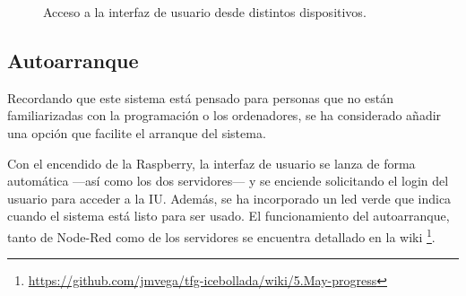 \begin{figure}[h!]
  \begin{center}
    \hspace{2mm}
  \end{center}
\caption{Acceso a la interfaz de usuario desde distintos dispositivos.} \label{fig:userlogin}
\end{figure}

\subsection{Autoarranque}
Recordando que este sistema está pensado para personas que no están familiarizadas con la programación o los ordenadores, se ha considerado añadir una opción que facilite el arranque del sistema.

Con el encendido de la Raspberry, la interfaz de usuario se lanza de forma automática ---así como los dos servidores--- y se enciende solicitando el login del usuario para acceder a la IU. Además, se ha incorporado un led verde que indica cuando el sistema está listo para ser usado. El funcionamiento del autoarranque, tanto de Node-Red como de los servidores se encuentra detallado en la wiki \footnote{\url{https://github.com/jmvega/tfg-icebollada/wiki/5.May-progress}}.